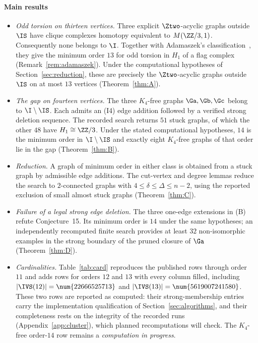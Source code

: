 \paragraph{Main results}
\begin{itemize}[leftmargin=2em]
\item[(A)] \emph{Odd torsion on thirteen vertices.} Three explicit $\Ztwo$-acyclic graphs outside $\IS$ have clique complexes homotopy equivalent to $M(\ZZ/3,1)$. Consequently none belongs to $\I$. Together with Adamaszek's classification~\cite{Adamaszek2014}, they give the minimum order $13$ for odd torsion in $H_1$ of a flag complex (Remark~\ref{rem:adamaszek}). Under the computational hypotheses of Section~\ref{sec:reduction}, these are precisely the $\Ztwo$-acyclic graphs outside $\IS$ on at most $13$ vertices (Theorem~\ref{thm:A}).
\item[(B)] \emph{The gap on fourteen vertices.} The three $K_4$-free graphs $\Ga,\Gb,\Gc$ belong to $\I\setminus\IS$. Each admits an (I4) edge addition followed by a verified strong deletion sequence. The recorded search returns $51$ stuck graphs, of which the other $48$ have $H_1\cong\ZZ/3$. Under the stated computational hypotheses, $14$ is the minimum order in $\I\setminus\IS$ and exactly eight $K_4$-free graphs of that order lie in the gap (Theorem~\ref{thm:B}).
\item[(C)] \emph{Reduction.} A graph of minimum order in either class is obtained from a stuck graph by admissible edge additions. The cut-vertex and degree lemmas reduce the search to $2$-connected graphs with $4\le\delta\le\Delta\le n-2$, using the reported exclusion of small almost stuck graphs (Theorem~\ref{thm:C}).
\item[(D)] \emph{Failure of a legal strong edge deletion.} The three one-edge extensions in (B) refute Conjecture~15. Its minimum order is $14$ under the same hypotheses; an independently recomputed finite search provides at least $32$ non-isomorphic examples in the strong boundary of the pruned closure of $\Ga$ (Theorem~\ref{thm:D}).
\item[(E)] \emph{Cardinalities.} Table~\ref{tab:card} reproduces the published rows through order $11$ and adds rows for orders $12$ and $13$ with every column filled, including $|\IVS(12)|=\num{22666525713}$ and $|\IVS(13)|=\num{5619007241580}$. These two rows are reported as computed: their strong-membership entries carry the implementation qualification of Section~\ref{sec:algorithms}, and their completeness rests on the integrity of the recorded runs (Appendix~\ref{app:cluster}), which planned recomputations will check. The $K_4$-free order-$14$ row remains a \emph{computation in progress}.
\end{itemize}


